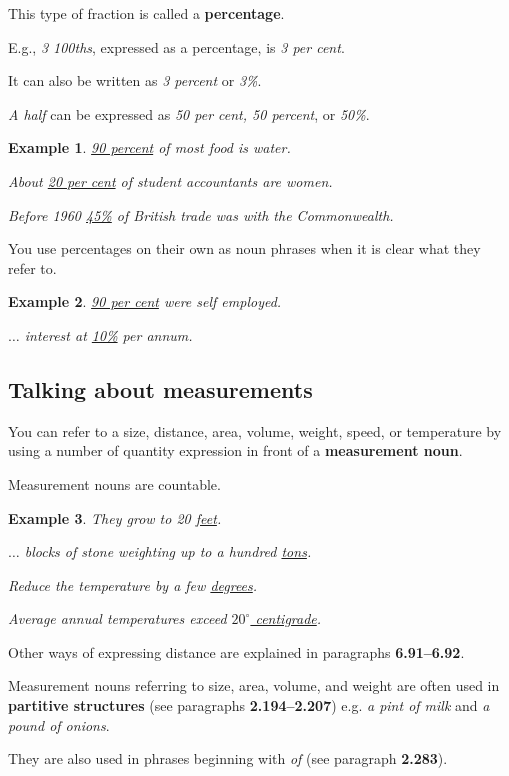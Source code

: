 \documentclass[oneside]{book}
\numberwithin{equation}{section}
\newtheorem{example}{Example}[section]
\begin{document}
This type of fraction is called a \textbf{percentage}.

E.g., \textit{3 100ths}, expressed as a percentage, is \textit{3 per cent}.

It can also be written as \textit{3 percent} or \textit{3\%}.

\textit{A half} can be expressed as \textit{50 per cent, 50 percent}, or \textit{50\%}.
\begin{example}
    \underline{90 percent} of most food is water.
    
    About \underline{20 per cent} of student accountants are women.
    
    Before 1960 \underline{45\%} of British trade was with the Commonwealth.
\end{example}
You use percentages on their own as noun phrases when it is clear what they refer to.
\begin{example}
    \underline{90 per cent} were self employed.
    
    $\ldots$ interest at \underline{10\%} per annum.
\end{example}

\subsection{Talking about measurements}
\noindent{} You can refer to a size, distance, area, volume, weight, speed, or temperature by using a number of quantity expression in front of a \textbf{measurement noun}.

Measurement nouns are countable.
\begin{example}
    They grow to 20 \underline{feet}.
    
    $\ldots$ blocks of stone weighting up to a hundred \underline{tons}.
    
    Reduce the temperature by a few \underline{degrees}.
    
    Average annual temperatures exceed \underline{$20^\circ$ centigrade}.
\end{example}
Other ways of expressing distance are explained in paragraphs \textbf{6.91--6.92}.

Measurement nouns referring to size, area, volume, and weight are often used in \textbf{partitive structures} (see paragraphs \textbf{2.194--2.207}) e.g. \textit{a pint of milk} and \textit{a pound of onions}.

They are also used in phrases beginning with \textit{of} (see paragraph \textbf{2.283}).
\end{document}
